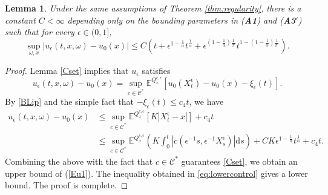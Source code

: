 \documentclass[11pt,reqno]{amsart}
\newtheorem{lem}[thm]{Lemma}
\theoremstyle{definition}
\theoremstyle{remark}
\numberwithin{equation}{section}
\newcommand{\eps}{\epsilon}
\begin{document}
\begin{lem}\label{CuI}
Under the same assumptions of Theorem \ref{thm:regularity},  
there is a constant $C<\infty$ depending only on the bounding parameters in {\upshape({\bf A1})} and {\upshape({\bf A3$'$})} such that for every $\epsilon \in (0,1]$,
\begin{equation}\label{Eu1}
    \sup_{\omega,x} |u_{\epsilon}(t,x,\omega) - u_{0}(x)| \leq C\left(t + \eps^{1-\frac1\alpha} t^{\frac1\alpha} + \eps^{(1-\frac1\alpha)\frac{1}{\beta'}} t^{1-(1-\frac1\alpha)\frac{1}{\beta'}}  \right).
\end{equation}
\end{lem}
\begin{proof}
Lemma \ref{Cset} implies that $u_{\epsilon}$ satisfies 
\begin{equation}
    u_{\epsilon}(t,x,\omega) - u_{0}(x) = \sup_{c\in\mathscr{C}^{\ast}} \mathbb{E}^{Q^{c,\epsilon}_{x}}[u_{0}(X^\eps_t)
    - u_{0}(x)-\xi_{\epsilon}(t)].
\end{equation}
By \eqref{BLip} and the simple fact that $-\xi_\eps(t) \le c_4 t$, we have%
\begin{align*}
    u_{\epsilon}(t,x,\omega) - u_{0}(x) &\le \sup_{c\in\mathscr{C}^{\ast}} \mathbb{E}^{Q^{c,\epsilon}_{x}}[K |X^{\epsilon}_t - x|] + c_4 t\\
    &\leq \sup_{c\in\mathscr{C}^{\ast}}\mathbb{E}^{Q^{c,\epsilon}_{x}}\left( K\int^{t}_{0} |c(\epsilon^{-1}s, \epsilon^{-1}X^{\epsilon}_{s})| \mathrm{d}s \right) + C K \epsilon^{1-\frac{1}{\alpha}} t^{\frac{1}{\alpha}} +c_4 t.
\end{align*}
Combining the above with the fact that $c \in \mathscr{C}^*$ guarantees \eqref{Cset}, we obtain an upper bound of (\ref{Eu1}). The inequality obtained in \eqref{eq:lowercontrol} gives a lower bound. The proof is complete.
\end{proof}


\medskip
\end{document}

